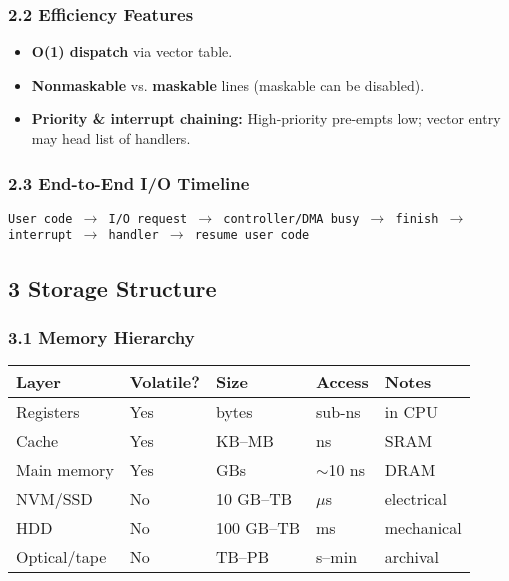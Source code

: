 \documentclass{article}
\begin{document}
\subsubsection*{2.2 Efficiency Features}
\begin{itemize}
    \item \textbf{O(1) dispatch} via vector table.
    \item \textbf{Nonmaskable} vs. \textbf{maskable} lines (maskable can be disabled).
    \item \textbf{Priority \& interrupt chaining:} High-priority pre-empts low; vector entry may head list of handlers.
\end{itemize}

\subsubsection*{2.3 End-to-End I/O Timeline}
\texttt{User code $\rightarrow$ I/O request $\rightarrow$ controller/DMA busy $\rightarrow$ finish $\rightarrow$ interrupt $\rightarrow$ handler $\rightarrow$ resume user code}

\subsection*{3 Storage Structure}
\subsubsection*{3.1 Memory Hierarchy}
\centering
\begin{tabular}{lllll}
\toprule
\textbf{Layer} & \textbf{Volatile?} & \textbf{Size} & \textbf{Access} & \textbf{Notes} \\
\midrule
Registers & Yes & bytes & sub-ns & in CPU \\
Cache & Yes & KB–MB & ns & SRAM \\
Main memory & Yes & GBs & $\sim$10 ns & DRAM \\
NVM/SSD & No & 10 GB–TB & $\mu$s & electrical \\
HDD & No & 100 GB–TB & ms & mechanical \\
Optical/tape & No & TB–PB & s–min & archival \\
\bottomrule
\end{tabular}
\vspace{\baselineskip}
\end{document}
